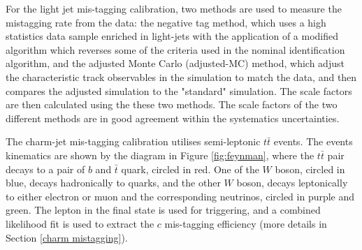 \documentclass[letterpaper,12pt]{article}
\begin{document}
For the light jet mis-tagging calibration, two methods are used to measure the mistagging rate from the data: the negative tag method, which uses a high statistics data sample enriched in light-jets with the application of a modified algorithm which reverses some of the criteria used in the nominal identification algorithm, and the adjusted Monte Carlo (adjusted-MC) method, which adjust the characteristic track observables in the simulation to match the data, and then compares the adjusted simulation to the "standard" simulation. The scale factors are then calculated using the these two methods. The scale factors of the two different methods are in good agreement within the systematics uncertainties\cite{ATLAS-CONF-2018-006}. 

The charm-jet mis-tagging calibration utilises semi-leptonic $t\bar{t}$ events. The events kinematics are shown by the diagram in Figure \ref{fig:feynman}, where the $t\bar{t}$ pair decays to a pair of $b$ and $\bar{t}$ quark, circled in red. One of the $W$ boson, circled in blue, decays hadronically to quarks, and the other $W$ boson, decays leptonically to either electron or muon and the corresponding neutrinos, circled in purple and green. The lepton in the final state is used for triggering, and a combined likelihood fit is used to extract the $c$ mis-tagging efficiency (more details in Section \ref{charm mistagging}). 
\end{document}
